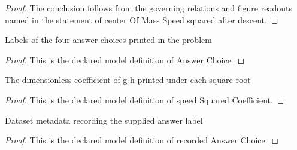 \begin{proof}
  The conclusion follows from the governing relations and figure readouts named in the statement of center Of Mass Speed squared after descent.
\end{proof}
\begin{definition}
  \label{def:physics:phyx-mini-0824:phyxminiproblems-problemphyxmini0824-answerchoice}
  Labels of the four answer choices printed in the problem
\end{definition}
\begin{proof}
  This is the declared model definition of Answer Choice.
\end{proof}
\begin{definition}
  \label{def:physics:phyx-mini-0824:phyxminiproblems-problemphyxmini0824-answerchoice-speedsquaredcoefficient}
  The dimensionless coefficient of g h printed under each square root
\end{definition}
\begin{proof}
  This is the declared model definition of speed Squared Coefficient.
\end{proof}
\begin{definition}
  \label{def:physics:phyx-mini-0824:phyxminiproblems-problemphyxmini0824-recordedanswerchoice}
  Dataset metadata recording the supplied answer label
\end{definition}
\begin{proof}
  This is the declared model definition of recorded Answer Choice.
\end{proof}
